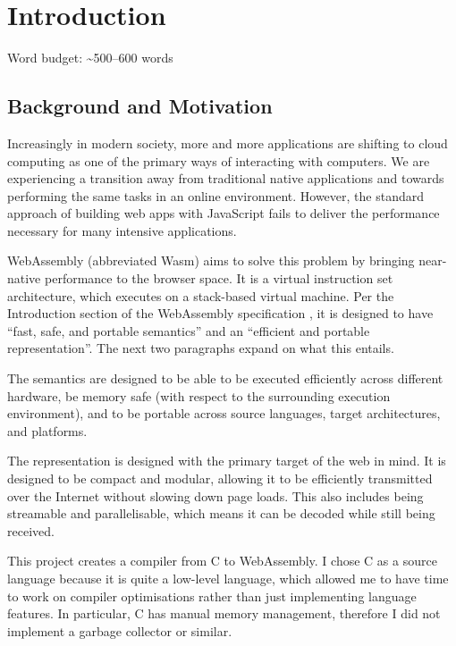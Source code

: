 \documentclass[00-main.tex]{subfiles}
\begin{document}
\chapter{Introduction}

\begin{mrwComment}
Word budget: \textasciitilde500--600 words
\end{mrwComment}

\section{Background and Motivation}

Increasingly in modern society, more and more applications are shifting to cloud computing as one of the primary ways of interacting with computers.
We are experiencing a transition away from traditional native applications and towards performing the same tasks in an online environment.
However, the standard approach of building web apps with JavaScript fails to deliver the performance necessary for many intensive applications.

WebAssembly (abbreviated Wasm) aims to solve this problem by bringing near-native performance to the browser space.
It is a virtual instruction set architecture, which executes on a stack-based virtual machine.
Per the Introduction section of the WebAssembly specification , it is designed to have ``fast, safe, and portable semantics'' and an ``efficient and portable representation''.
The next two paragraphs expand on what this entails.

The semantics are designed to be able to be executed efficiently across different hardware, be memory safe (with respect to the surrounding execution environment), and to be portable across source languages, target architectures, and platforms.

The representation is designed with the primary target of the web in mind.
It is designed to be compact and modular, allowing it to be efficiently transmitted over the Internet without slowing down page loads.
This also includes being streamable and parallelisable, which means it can be decoded while still being received.

This project creates a compiler from C to WebAssembly.
I chose C as a source language because it is quite a low-level language, which allowed me to have time to work on compiler optimisations rather than just implementing language features.
In particular, C has manual memory management, therefore I did not implement a garbage collector or similar.
\end{document}
